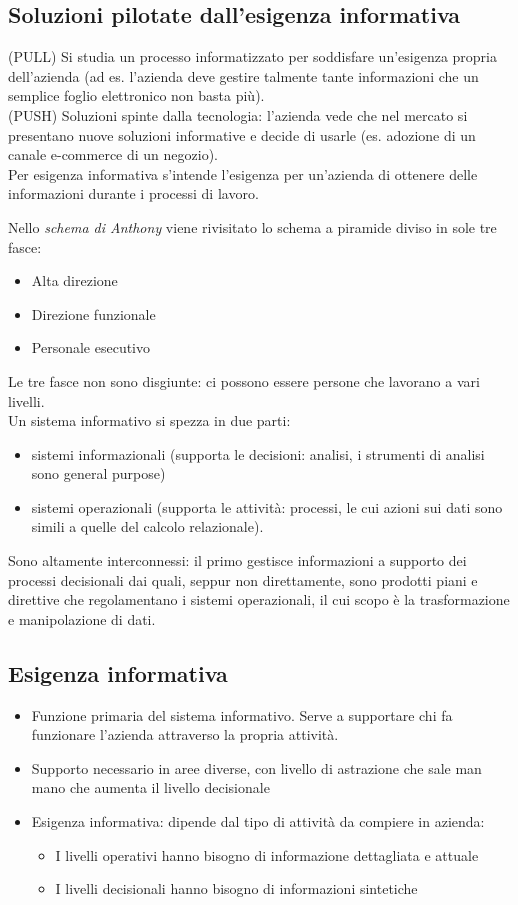\subsection{Soluzioni pilotate dall'esigenza informativa}
\label{sub:Processi informatizzati 3}
(PULL) Si studia un processo informatizzato per soddisfare un'esigenza propria dell'azienda (ad es. l'azienda deve gestire talmente tante informazioni che un semplice foglio elettronico non basta pi\`u).\\
(PUSH) Soluzioni spinte dalla tecnologia: l'azienda vede che nel mercato si
presentano nuove soluzioni informative e decide di usarle (es. adozione di un canale e-commerce di un negozio).\\
Per esigenza informativa s'intende l'esigenza per un'azienda di ottenere delle informazioni durante i processi di lavoro.

Nello \textit{schema di Anthony} viene rivisitato lo schema a piramide diviso in sole tre fasce:
\begin{itemize}
  \item Alta direzione
  \item Direzione funzionale
  \item Personale esecutivo
\end{itemize}
Le tre fasce non sono disgiunte: ci possono essere persone che lavorano a vari livelli.\\
Un sistema informativo si spezza in due parti:
\begin{itemize}
  \item sistemi informazionali (supporta le decisioni: analisi, i strumenti di analisi
sono general purpose)
  \item sistemi operazionali (supporta le attivit\`a: processi, le cui azioni sui dati sono simili a quelle del calcolo relazionale).
\end{itemize}
Sono altamente interconnessi: il primo gestisce informazioni a supporto
dei processi decisionali dai quali, seppur non direttamente, sono prodotti piani
e direttive che regolamentano i sistemi operazionali, il cui scopo \`e la trasformazione
e manipolazione di dati.


\subsection{Esigenza informativa}
\begin{itemize}
  \item Funzione primaria del sistema informativo. Serve a supportare chi fa funzionare l'azienda attraverso la propria attivit\`a.
  \item Supporto necessario in aree diverse, con livello di astrazione che sale man mano che aumenta il livello decisionale
  \item Esigenza informativa: dipende dal tipo di attivit\`a da compiere in azienda:
  \begin{itemize}
    \item I livelli operativi hanno bisogno di informazione dettagliata e attuale
    \item I livelli decisionali hanno bisogno di informazioni sintetiche
  \end{itemize}
\end{itemize}

